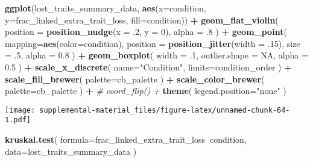 \documentclass[]{book}
\newenvironment{Shaded}{\begin{snugshade}}{\end{snugshade}}
\newcommand{\CommentTok}[1]{\textcolor[rgb]{0.56,0.35,0.01}{\textit{#1}}}
\newcommand{\DataTypeTok}[1]{\textcolor[rgb]{0.13,0.29,0.53}{#1}}
\newcommand{\DecValTok}[1]{\textcolor[rgb]{0.00,0.00,0.81}{#1}}
\newcommand{\FloatTok}[1]{\textcolor[rgb]{0.00,0.00,0.81}{#1}}
\newcommand{\KeywordTok}[1]{\textcolor[rgb]{0.13,0.29,0.53}{\textbf{#1}}}
\newcommand{\NormalTok}[1]{#1}
\newcommand{\OperatorTok}[1]{\textcolor[rgb]{0.81,0.36,0.00}{\textbf{#1}}}
\newcommand{\OtherTok}[1]{\textcolor[rgb]{0.56,0.35,0.01}{#1}}
\newcommand{\StringTok}[1]{\textcolor[rgb]{0.31,0.60,0.02}{#1}}
\begin{document}
\begin{Shaded}
\begin{Highlighting}[]
\KeywordTok{ggplot}\NormalTok{(lost_traits_summary_data, }\KeywordTok{aes}\NormalTok{(}\DataTypeTok{x=}\NormalTok{condition, }\DataTypeTok{y=}\NormalTok{frac_linked_extra_trait_loss, }\DataTypeTok{fill=}\NormalTok{condition)) }\OperatorTok{+}
\StringTok{  }\KeywordTok{geom_flat_violin}\NormalTok{(}
    \DataTypeTok{position =} \KeywordTok{position_nudge}\NormalTok{(}\DataTypeTok{x =} \FloatTok{.2}\NormalTok{, }\DataTypeTok{y =} \DecValTok{0}\NormalTok{),}
    \DataTypeTok{alpha =} \FloatTok{.8}
\NormalTok{  ) }\OperatorTok{+}
\StringTok{  }\KeywordTok{geom_point}\NormalTok{(}
    \DataTypeTok{mapping=}\KeywordTok{aes}\NormalTok{(}\DataTypeTok{color=}\NormalTok{condition),}
    \DataTypeTok{position =} \KeywordTok{position_jitter}\NormalTok{(}\DataTypeTok{width =} \FloatTok{.15}\NormalTok{),}
    \DataTypeTok{size =} \FloatTok{.5}\NormalTok{,}
    \DataTypeTok{alpha =} \FloatTok{0.8}
\NormalTok{  ) }\OperatorTok{+}
\StringTok{  }\KeywordTok{geom_boxplot}\NormalTok{(}
    \DataTypeTok{width =} \FloatTok{.1}\NormalTok{,}
    \DataTypeTok{outlier.shape =} \OtherTok{NA}\NormalTok{,}
    \DataTypeTok{alpha =} \FloatTok{0.5}
\NormalTok{  ) }\OperatorTok{+}
\StringTok{  }\KeywordTok{scale_x_discrete}\NormalTok{(}
    \DataTypeTok{name=}\StringTok{"Condition"}\NormalTok{,}
    \DataTypeTok{limits=}\NormalTok{condition_order}
\NormalTok{  ) }\OperatorTok{+}
\StringTok{  }\KeywordTok{scale_fill_brewer}\NormalTok{(}
    \DataTypeTok{palette=}\NormalTok{cb_palette}
\NormalTok{  ) }\OperatorTok{+}
\StringTok{  }\KeywordTok{scale_color_brewer}\NormalTok{(}
    \DataTypeTok{palette=}\NormalTok{cb_palette}
\NormalTok{  ) }\OperatorTok{+}
\StringTok{  }\CommentTok{# coord_flip() +}
\StringTok{  }\KeywordTok{theme}\NormalTok{(}
    \DataTypeTok{legend.position=}\StringTok{"none"}
\NormalTok{  )}
\end{Highlighting}
\end{Shaded}

\texttt{[image: supplemental-material\_files/figure-latex/unnamed-chunk-64-1.pdf]}

\begin{Shaded}
\begin{Highlighting}[]
\KeywordTok{kruskal.test}\NormalTok{(}
  \DataTypeTok{formula=}\NormalTok{frac_linked_extra_trait_loss}\OperatorTok{~}\NormalTok{condition,}
  \DataTypeTok{data=}\NormalTok{lost_traits_summary_data}
\NormalTok{)}
\end{Highlighting}
\end{Shaded}
\end{document}
